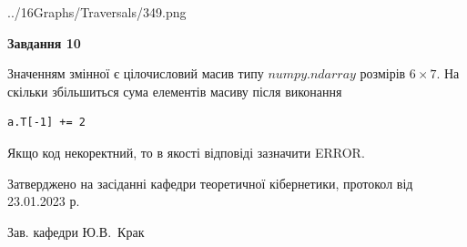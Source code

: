\documentclass[12pt, ukrainian]{article}
\begin{document}
{\begin {large}
\begin{center}
	{../16Graphs/Traversals/349.png}
\end{center}\par
\newpage

{\begin {center}\textbf{Завдання 10}\end {center}}\par
Значенням змінної  є цілочисловий масив типу $numpy.ndarray$ розмірів $6{\times}7$. На скільки збільшиться сума елементів масиву  після виконання
\begin{verbatim}
a.T[-1] += 2
\end{verbatim}


Якщо код некоректний, то в якості відповіді зазначити ERROR.\par
\newpage


\end {large}
}
{\smallskip \begin {small} Затверджено на засіданні кафедри теоретичної кібернетики, протокол  від   23.01.2023 р.\par\smallskip\smallskip
{\parbox {6.5 cm}{Зав. кафедри \dotfill Ю.В.~Крак}} \end{small}}
\end{document}
